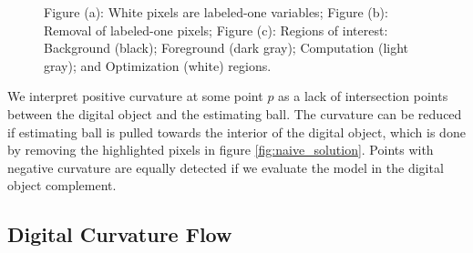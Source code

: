 \documentclass[runningheads]{llncs}
\begin{document}
	\begin{figure}[!ht]
		\center
		\hspace{40pt}
		\hspace{40pt}
		\caption{Figure (a): White pixels are labeled-one variables; Figure (b): Removal of labeled-one pixels; Figure (c): Regions of interest: Background (black); Foreground (dark gray); Computation (light gray); and Optimization (white) regions.}	
					
	\end{figure}

We interpret positive curvature at some point $p$ as a lack of intersection points between the digital object and the estimating ball. The curvature can be reduced if estimating ball is pulled towards the interior of the digital object, which is done by removing the highlighted pixels in figure \ref{fig:naive_solution}. Points with negative curvature are equally detected if we evaluate the model in the digital object complement.

\subsection{Digital Curvature Flow}
\end{document}
